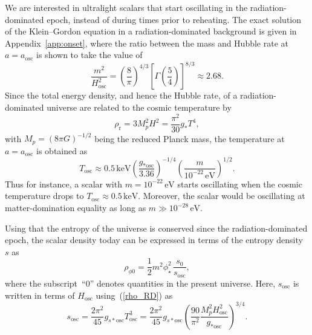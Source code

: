 \documentclass[11pt,nofootinbib]{article}
\numberwithin{equation}{section}
\begin{document}
We are interested in ultralight scalars that start oscillating in the
radiation-dominated epoch, instead of during times prior to reheating. 
The exact solution of the Klein--Gordon equation in a radiation-dominated
background is given in Appendix~\ref{app:onset}, 
where the ratio between the mass and Hubble rate at $a =
a_{\mathrm{osc}}$ is shown to take the value of
\begin{equation}
 \frac{m^2}{H_{\mathrm{osc}}^2} = 
  \left( \frac{8}{\pi }  \right)^{4/3}
  \left[ \Gamma \left(\frac{5}{4} \right) \right]^{8/3}
  \approx 2.68.
\label{2.68}
\end{equation}
Since the total energy density, and hence the Hubble rate, of a radiation-dominated
universe are related to the cosmic temperature by
\begin{equation}
 \rho_{\mathrm{r}} =  3 M_p^2 H^2  = \frac{\pi^2}{30}g_* T^4,
\label{rho_RD}
\end{equation}
with $M_p = (8 \pi G)^{-1/2} $
being the reduced Planck mass,
the temperature at $a = a_{\mathrm{osc}}$ is obtained as
\begin{equation}
 T_{\mathrm{osc}} \approx 0.5 \, \mathrm{keV}
  \left(\frac{g_{*\mathrm{osc}}}{3.36}\right)^{-1/4}
  \left(\frac{m}{10^{-22}\, \mathrm{eV}}  \right)^{1/2}.
  \label{Tosc}
\end{equation}
Thus for instance, a scalar with $m = 10^{-22}\, \mathrm{eV}$
starts oscillating when the cosmic temperature drops to
$T_{\mathrm{osc}} \approx 0.5 \, \mathrm{keV}$.
Moreover, the scalar would be oscillating at
matter-domination equality as long as $m \gg 10^{-28}\, \mathrm{eV}$.

Using that the entropy of the universe is conserved since the radiation-dominated
epoch, the scalar density today can be expressed in terms of the entropy density~$s$ as
\begin{equation}
 \rho_{\phi 0 } = \frac{1}{2} m^2 \phi_{\star}^2
  \, \frac{s_0}{s_{\mathrm{osc}}},
\label{rhophi0}
\end{equation}
where the subscript~``$0$'' denotes quantities in the present universe.
Here, $s_{\mathrm{osc}}$ is written in terms of $H_{\mathrm{osc}}$
using~(\ref{rho_RD}) as
\begin{equation}
 s_{\mathrm{osc}}
= \frac{2 \pi^2}{45}g_{s* \mathrm{osc}} T_{\mathrm{osc}}^3
= \frac{2 \pi^2}{45}
  g_{s*\mathrm{osc}}
  \left(\frac{90}{\pi^2}
 \frac{ M_p^2 H_{\mathrm{osc}}^2}{g_{*\mathrm{osc}}}
  \right)^{3/4}  .
\label{sosc}
\end{equation}
\end{document}
